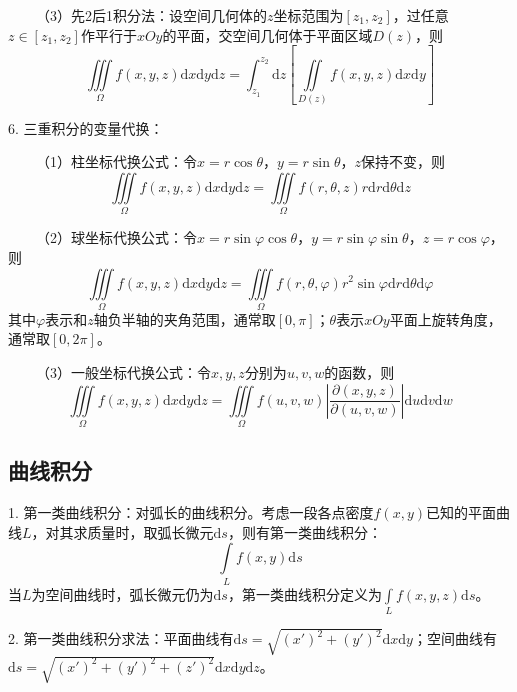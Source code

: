 ~~~~（3）先2后1积分法：设空间几何体的$z$坐标范围为$[z_1,z_2]$，过任意$z\in[z_1,z_2]$作平行于$xOy$的平面，交空间几何体于平面区域$D(z)$，则
\begin{equation*}
    \iiint\limits_\Omega f(x,y,z)\mathrm{d}x\mathrm{d}y\mathrm{d}z=\int_{z_1}^{z_2}\mathrm{d}z\left[\iint\limits_{D(z)}f(x,y,z)\mathrm{d}x\mathrm{d}y\right]
\end{equation*}

6. 三重积分的变量代换：

~~~~（1）柱坐标代换公式：令$x=r\cos\theta$，$y=r\sin\theta$，$z$保持不变，则
\begin{equation*}
    \iiint\limits_{\Omega}f(x,y,z)\mathrm{d}x\mathrm{d}y\mathrm{d}z=\iiint\limits_{\Omega}f(r,\theta,z)r\mathrm{d}r\mathrm{d}\theta\mathrm{d}z
\end{equation*}

~~~~（2）球坐标代换公式：令$x=r\sin\varphi\cos\theta$，$y=r\sin\varphi\sin\theta$，$z=r\cos\varphi$，则
\begin{equation*}
    \iiint\limits_{\Omega}f(x,y,z)\mathrm{d}x\mathrm{d}y\mathrm{d}z=\iiint\limits_{\Omega}f(r,\theta,\varphi)r^2\sin\varphi\mathrm{d}r\mathrm{d}\theta\mathrm{d}\varphi
\end{equation*}
其中$\varphi$表示和$z$轴负半轴的夹角范围，通常取$[0,\pi]$；$\theta$表示$xOy$平面上旋转角度，通常取$[0,2\pi]$。

~~~~（3）一般坐标代换公式：令$x,y,z$分别为$u,v,w$的函数，则
\begin{equation*}
    \iiint\limits_{\Omega}f(x,y,z)\mathrm{d}x\mathrm{d}y\mathrm{d}z=\iiint\limits_{\Omega}f(u,v,w)\left|\frac{\partial(x,y,z)}{\partial(u,v,w)}\right|\mathrm{d}u\mathrm{d}v\mathrm{d}w
\end{equation*}

\subsection{曲线积分}

1. 第一类曲线积分：对弧长的曲线积分。考虑一段各点密度$f(x,y)$已知的平面曲线$L$，对其求质量时，取弧长微元$\mathrm{d}s$，则有第一类曲线积分：
\begin{equation*}
    \int\limits_L f(x,y)\mathrm{d} s
\end{equation*}
当$L$为空间曲线时，弧长微元仍为$\mathrm{d}s$，第一类曲线积分定义为$\int \limits_L f(x,y,z)\mathrm{d} s$。

2. 第一类曲线积分求法：平面曲线有$\mathrm{d}s=\sqrt{(x')^2+(y')^2} \mathrm{d}x\mathrm{d}y$；空间曲线有$\mathrm{d}s=\sqrt{(x')^2+(y')^2+(z')^2} \mathrm{d}x\mathrm{d}y\mathrm{d}z$。

